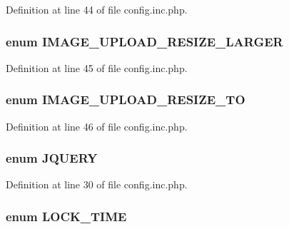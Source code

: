 Definition at line 44 of file config.inc.php.

\hypertarget{config_8inc_8php_a009a803b2fcec74eb8fd6b90dfebd680}{
\subsubsection[{IMAGE\_\-UPLOAD\_\-RESIZE\_\-LARGER}]{\setlength{\rightskip}{0pt plus 5cm}enum {\bf IMAGE\_\-UPLOAD\_\-RESIZE\_\-LARGER}}}
\label{config_8inc_8php_a009a803b2fcec74eb8fd6b90dfebd680}


Definition at line 45 of file config.inc.php.

\hypertarget{config_8inc_8php_a86484d4f8051155268e7c23ac4d1f5f4}{
\subsubsection[{IMAGE\_\-UPLOAD\_\-RESIZE\_\-TO}]{\setlength{\rightskip}{0pt plus 5cm}enum {\bf IMAGE\_\-UPLOAD\_\-RESIZE\_\-TO}}}
\label{config_8inc_8php_a86484d4f8051155268e7c23ac4d1f5f4}


Definition at line 46 of file config.inc.php.

\hypertarget{config_8inc_8php_a5c2fff7e41a0380fb7872627e3a14a29}{
\subsubsection[{JQUERY}]{\setlength{\rightskip}{0pt plus 5cm}enum {\bf JQUERY}}}
\label{config_8inc_8php_a5c2fff7e41a0380fb7872627e3a14a29}


Definition at line 30 of file config.inc.php.

\hypertarget{config_8inc_8php_a924ae40271cc363050158e36b3823407}{
\subsubsection[{LOCK\_\-TIME}]{\setlength{\rightskip}{0pt plus 5cm}enum {\bf LOCK\_\-TIME}}}
\label{config_8inc_8php_a924ae40271cc363050158e36b3823407}


